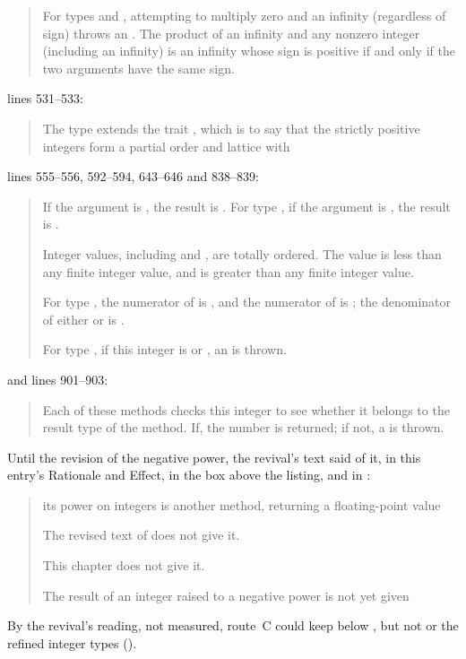 \begin{description}
\begin{quote}
For types  and , attempting to multiply
zero and an infinity (regardless of sign) throws an .
The product of an infinity and any nonzero integer (including an infinity)
is an infinity whose sign is positive if and only if the two arguments have the same sign.
\end{quote}
lines 531--533:
\begin{quote}
The type  extends the trait
,
which is to say that the strictly positive integers form a partial order and lattice with
\end{quote}
lines 555--556, 592--594, 643--646 and 838--839:
\begin{quote}
If the argument is , the result is .  For type ,
if the argument is \EXP{+\infty}, the result is \EXP{+\infty}.

Integer values, including \EXP{+\infty} and \EXP{-\infty}, are totally ordered.
The value \EXP{-\infty} is less than any finite integer value,
and \EXP{+\infty} is greater than any finite integer value.

For type ,
the numerator of \EXP{+\infty} is ,
and the numerator of \EXP{-\infty} is ;
the denominator of either \EXP{+\infty} or \EXP{-\infty} is .

For type , if this integer is \EXP{+\infty} or \EXP{-\infty},
an  is thrown.
\end{quote}
and lines 901--903:
\begin{quote}
Each of these methods checks this integer to see whether it belongs
to the result type of the method.  If, the number is returned; if not,
a  is thrown.
\end{quote}
Until the revision of the negative power, the revival's text said of it, in
this entry's Rationale and Effect, in the box above the listing, and in
:
\begin{quote}
its power on integers is another method, returning a floating-point value

The revised text of  does not give it.

This chapter does not give it.

The result of an integer raised to a negative power is not yet given
\end{quote}
\item[Route C] By the revival's reading, not measured, route~C could keep
 below , but not  or the refined
integer types ().
\end{description}

